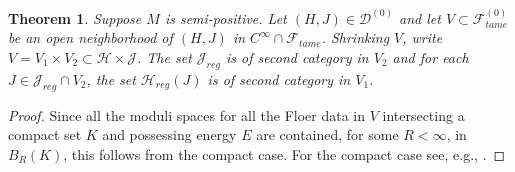 \documentclass[11pt]{amsart}
\newtheorem{tm}{Theorem}[section]
\theoremstyle{definition}
\theoremstyle{remark}
\begin{document}
\begin{tm}\label{NondegDiss}
Suppose $M$ is semi-positive. Let $(H,J)\in\mathcal{D}^{(0)}$ and let $V\subset\mathcal{F}^{(0)}_{tame}$ be an open neighborhood of $(H,J)$ in $C^{\infty}\cap\mathcal{F}_{tame}$.  Shrinking $V$, write $V=V_1\times V_2\subset\mathcal{H}\times\mathcal{J}$. The set $\mathcal{J}_{reg}$ is of second category in $V_2$ and for each $J\in\mathcal{J}_{reg}\cap V_2$, the set $\mathcal{H}_{reg}(J)$ is of second category in $V_1$.

\end{tm}
\begin{proof}
Since all the moduli spaces for all the Floer data in $V$ intersecting a compact set $K$ and possessing energy $E$ are contained, for some $R<\infty$, in $B_R(K)$, this follows from the compact case. For the compact case see, e.g., \cite{HoferSalamon}.
\end{proof}
\end{document}
